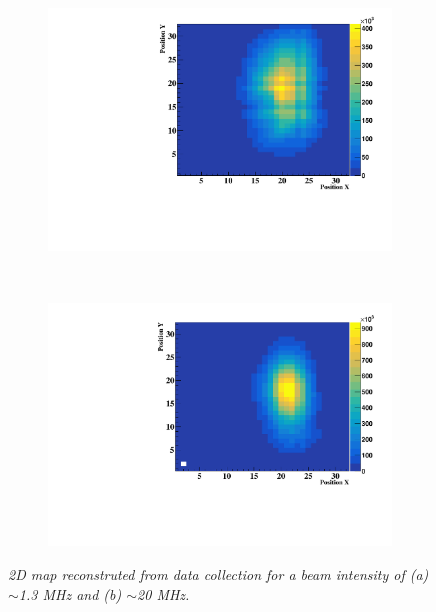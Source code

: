 \documentclass[a4paper,11pt]{article}
\begin{document}
\begin{figure}[htb]
\centering
    \begin{subfigure}{0.45\textwidth} \centering \includegraphics[width=\textwidth]{figures/2D_Map_1MHz.pdf} \caption{} \label{fig:2D_1MHz}
    \end{subfigure}
    ~
    \begin{subfigure}{0.45\textwidth} \centering \includegraphics[width=\textwidth]{figures/2D_Map_20MHz.pdf} \caption{} \label{fig:2D_20MHz}
    \end{subfigure}
\caption{\small{\textit{2D map reconstruted from data collection for a beam intensity of (a) $\sim$1.3 MHz and (b) $\sim$20 MHz.}}}
\label{fig:2D_Maps}
\end{figure}
\end{document}
